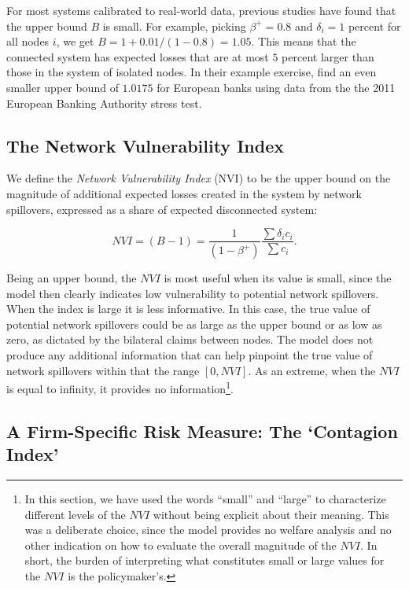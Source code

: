 For most systems calibrated to real-world data, previous studies have found that the upper bound $B$ is small. For example, picking $\beta ^{+}=0.8$ and $\delta _{i}=1$ percent for all nodes $i$, we get $B=1+0.01/(1-0.8)=1.05$. This means that the connected system has expected losses that are at most $5$ percent larger than those in the system of isolated nodes. In their example exercise, \citet{glasserman2015likely} find an even smaller upper bound of $1.0175$ for European banks using data from the the 2011 European Banking Authority stress test.

\subsection{The Network Vulnerability Index}

We define the \emph{Network Vulnerability Index} (NVI) to be the upper bound on the magnitude of additional expected losses created in the system by network spillovers, expressed as a share of expected disconnected system:

\begin{equation} \label{eq:NVI}
NVI=\left( B-1\right) = \frac{1}{(1-\beta ^{+})}\frac{\sum {\delta _{i}c_{i}}}{\sum {c_{i}}}.
\end{equation}

Being an upper bound, the $NVI$ is most useful when its value is small, since the model then clearly indicates low vulnerability to potential network spillovers. When the index is large it is less informative. In this case, the true value of potential network spillovers could be as large as the upper bound or as low as zero, as dictated by the bilateral claims between nodes. The model does not produce any additional information that can help pinpoint the true value of network spillovers within that the range $\left[ 0,NVI\right] $. As an extreme, when the $NVI$ is equal to infinity, it provides no information\footnote{In this section, we have used the words ``small'' and ``large'' to characterize different levels of the $NVI$ without being explicit about their meaning. This was a deliberate choice, since the model provides no welfare analysis and no other indication on how to evaluate the overall magnitude of the $NVI$. In short, the burden of interpreting what constitutes small or large values for the $NVI$ is the policymaker's.}.

\subsection{A Firm-Specific Risk Measure: The `Contagion Index'}

